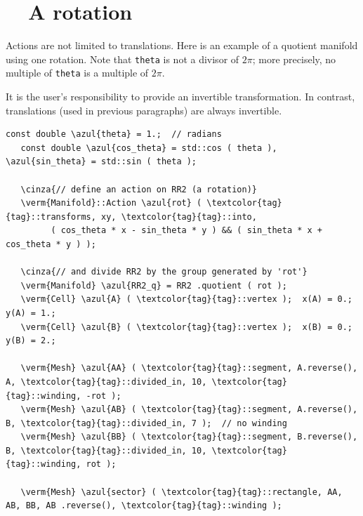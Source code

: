 \section{~~A rotation}\label{\numb section 7.\numb parag 11}

Actions are not limited to translations.
Here is an example of a quotient manifold using one rotation.
Note that {\small\tt theta} is not a divisor of $ 2\pi $;
more precisely, no multiple of {\small\tt theta} is a multiple of $ 2\pi $.

It is the user's responsibility to provide an invertible transformation.
In contrast, translations (used in previous paragraphs) are always invertible.

\begin{Verbatim}[commandchars=\\\{\},formatcom=\small\tt,frame=single,
   label=parag-\ref{\numb section 7.\numb parag 11}.cpp,rulecolor=\color{coment},
   baselinestretch=0.94,framesep=2mm                                             ]
   const double \azul{theta} = 1.;  // radians
   const double \azul{cos_theta} = std::cos ( theta ), \azul{sin_theta} = std::sin ( theta );
	
   \cinza{// define an action on RR2 (a rotation)}
   \verm{Manifold}::Action \azul{rot} ( \textcolor{tag}{tag}::transforms, xy, \textcolor{tag}{tag}::into,
         ( cos_theta * x - sin_theta * y ) && ( sin_theta * x + cos_theta * y ) );

   \cinza{// and divide RR2 by the group generated by 'rot'}
   \verm{Manifold} \azul{RR2_q} = RR2 .quotient ( rot );
   \verm{Cell} \azul{A} ( \textcolor{tag}{tag}::vertex );  x(A) = 0.;  y(A) = 1.;
   \verm{Cell} \azul{B} ( \textcolor{tag}{tag}::vertex );  x(B) = 0.;  y(B) = 2.;

   \verm{Mesh} \azul{AA} ( \textcolor{tag}{tag}::segment, A.reverse(), A, \textcolor{tag}{tag}::divided_in, 10, \textcolor{tag}{tag}::winding, -rot );
   \verm{Mesh} \azul{AB} ( \textcolor{tag}{tag}::segment, A.reverse(), B, \textcolor{tag}{tag}::divided_in, 7 );  // no winding
   \verm{Mesh} \azul{BB} ( \textcolor{tag}{tag}::segment, B.reverse(), B, \textcolor{tag}{tag}::divided_in, 10, \textcolor{tag}{tag}::winding, rot );

   \verm{Mesh} \azul{sector} ( \textcolor{tag}{tag}::rectangle, AA, AB, BB, AB .reverse(), \textcolor{tag}{tag}::winding );
\end{Verbatim}

